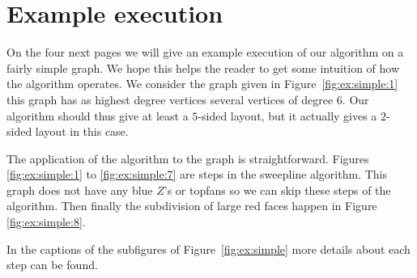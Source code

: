 
\section{Example execution} %
\label{s:ex}
\thispagestyle{plain}

On the four next pages we will give an example execution of our algorithm on a fairly simple graph.
We hope this helps the reader to get some intuition of how the algorithm operates. We consider the graph given in Figure~\ref{fig:ex:simple:1} this graph has as highest degree vertices several vertices of degree 6. Our algorithm should thus give at least a $5$-sided layout, but it actually gives a $2$-sided layout in this case.

The application of the algorithm to the graph is straightforward. Figures \ref{fig:ex:simple:1} to \ref{fig:ex:simple:7} are steps in the sweepline algorithm. This graph does not have any blue $Z$'s or topfans so we can skip these steps of the algorithm.
Then finally the subdivision of large red faces happen in Figure \ref{fig:ex:simple:8}.

In the captions of the subfigures of Figure~\ref{fig:ex:simple} more details about each step can be found.


